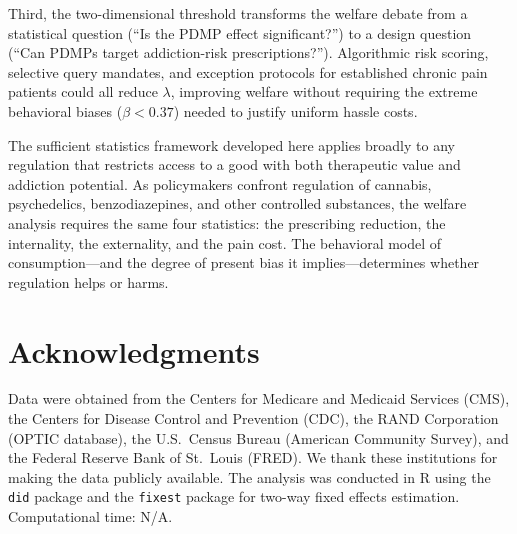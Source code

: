 \documentclass[12pt]{article}
\newcommand{\apepcumulativetime}{N/A}
\begin{document}
Third, the two-dimensional threshold transforms the welfare debate from a statistical question (``Is the PDMP effect significant?'') to a design question (``Can PDMPs target addiction-risk prescriptions?''). Algorithmic risk scoring, selective query mandates, and exception protocols for established chronic pain patients could all reduce $\lambda$, improving welfare without requiring the extreme behavioral biases ($\beta < 0.37$) needed to justify uniform hassle costs.

The sufficient statistics framework developed here applies broadly to any regulation that restricts access to a good with both therapeutic value and addiction potential. As policymakers confront regulation of cannabis, psychedelics, benzodiazepines, and other controlled substances, the welfare analysis requires the same four statistics: the prescribing reduction, the internality, the externality, and the pain cost. The behavioral model of consumption---and the degree of present bias it implies---determines whether regulation helps or harms.


\section*{Acknowledgments}

Data were obtained from the Centers for Medicare and Medicaid Services (CMS), the Centers for Disease Control and Prevention (CDC), the RAND Corporation (OPTIC database), the U.S.\ Census Bureau (American Community Survey), and the Federal Reserve Bank of St.\ Louis (FRED). We thank these institutions for making the data publicly available. The analysis was conducted in R using the \texttt{did} package \citep{callaway2021difference} and the \texttt{fixest} package for two-way fixed effects estimation. Computational time: \apepcumulativetime.

\label{apep_main_text_end}

\newpage


\newpage

\appendix

\end{document}
